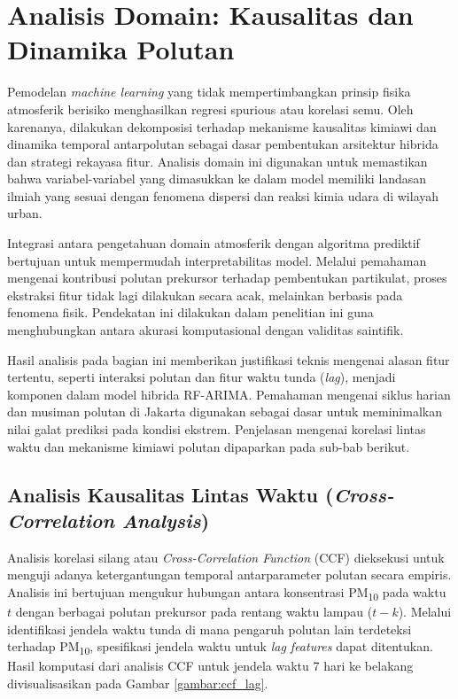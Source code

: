 \section{Analisis Domain: Kausalitas dan Dinamika Polutan}

Pemodelan \textit{machine learning} yang tidak mempertimbangkan prinsip fisika atmosferik berisiko menghasilkan regresi spurious atau korelasi semu. Oleh karenanya, dilakukan dekomposisi terhadap mekanisme kausalitas kimiawi dan dinamika temporal antarpolutan sebagai dasar pembentukan arsitektur hibrida dan strategi rekayasa fitur. Analisis domain ini digunakan untuk memastikan bahwa variabel-variabel yang dimasukkan ke dalam model memiliki landasan ilmiah yang sesuai dengan fenomena dispersi dan reaksi kimia udara di wilayah urban.

Integrasi antara pengetahuan domain atmosferik dengan algoritma prediktif bertujuan untuk mempermudah interpretabilitas model. Melalui pemahaman mengenai kontribusi polutan prekursor terhadap pembentukan partikulat, proses ekstraksi fitur tidak lagi dilakukan secara acak, melainkan berbasis pada fenomena fisik. Pendekatan ini dilakukan dalam penelitian ini guna menghubungkan antara akurasi komputasional dengan validitas saintifik.

Hasil analisis pada bagian ini memberikan justifikasi teknis mengenai alasan fitur tertentu, seperti interaksi polutan dan fitur waktu tunda (\textit{lag}), menjadi komponen dalam model hibrida RF-ARIMA. Pemahaman mengenai siklus harian dan musiman polutan di Jakarta digunakan sebagai dasar untuk meminimalkan nilai galat prediksi pada kondisi ekstrem. Penjelasan mengenai korelasi lintas waktu dan mekanisme kimiawi polutan dipaparkan pada sub-bab berikut.

\newpage

\subsection{Analisis Kausalitas Lintas Waktu (\textit{Cross-Correlation Analysis})}

Analisis korelasi silang atau \textit{Cross-Correlation Function} (CCF) dieksekusi untuk menguji adanya ketergantungan temporal antarparameter polutan secara empiris. Analisis ini bertujuan mengukur hubungan antara konsentrasi PM\textsubscript{10} pada waktu $t$ dengan berbagai polutan prekursor pada rentang waktu lampau ($t-k$). Melalui identifikasi jendela waktu tunda di mana pengaruh polutan lain terdeteksi terhadap PM\textsubscript{10}, spesifikasi jendela waktu untuk \textit{lag features} dapat ditentukan. Hasil komputasi dari analisis CCF untuk jendela waktu 7 hari ke belakang divisualisasikan pada Gambar \ref{gambar:ccf_lag}.

